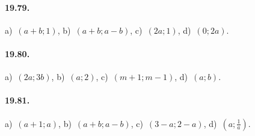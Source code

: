 \paragraph{19.79.} a)~$(a+b;1)$, \quad b)~$(a+b;a-b)$, \quad c)~$(2a;1)$, \quad d)~$(0;2a)$.

\paragraph{19.80.} a)~$(2a;3b)$, \quad b)~$(a;2)$, \quad c)~$(m+1;m-1)$, \quad d)~$(a;b)$.

\paragraph{19.81.} a)~$(a+1;a)$, \quad b)~$(a+b;a-b)$, \quad c)~$(3-a;2-a)$, \quad d)~$\left(a;\frac{1}{a}\right)$.


